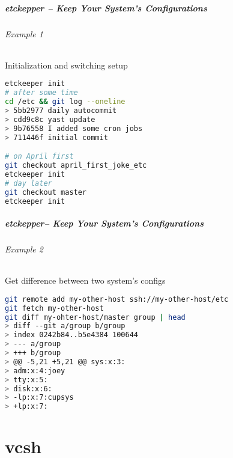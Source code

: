 \documentclass[english,hyperref={pdfpagelabels=false},aspectratio=169]{beamer}
\begin{document}
\begin{frame}[fragile]
  \frametitle{etckepper -- Keep Your System's Configurations}
  \framesubtitle{Example 1}
  \begin{block}{Initialization and switching setup}
    \vspace{-0.75em}
    \begin{lstlisting}[language=zsh]
etckeeper init
# after some time
cd /etc && git log --oneline
> 5bb2977 daily autocommit
> cdd9c8c yast update
> 9b76558 I added some cron jobs
> 711446f initial commit

# on April first
git checkout april_first_joke_etc
etckeeper init
# day later
git checkout master
etckeeper init
    \end{lstlisting}
    \vspace{-0.75em}
  \end{block}
\end{frame}

\begin{frame}[fragile]
  \frametitle{etckepper-- Keep Your System's Configurations}
  \framesubtitle{Example 2}
  \begin{block}{Get difference between two system's configs}
    \vspace{-0.75em}
    \begin{lstlisting}[language=zsh]
git remote add my-other-host ssh://my-other-host/etc
git fetch my-other-host
git diff my-ohter-host/master group | head
> diff --git a/group b/group
> index 0242b84..b5e4384 100644
> --- a/group
> +++ b/group
> @@ -5,21 +5,21 @@ sys:x:3:
> adm:x:4:joey
> tty:x:5:
> disk:x:6:
> -lp:x:7:cupsys
> +lp:x:7:
    \end{lstlisting}
    \vspace{-0.75em}
  \end{block}
\end{frame}


\part{vcsh}
\makepart
\end{document}
